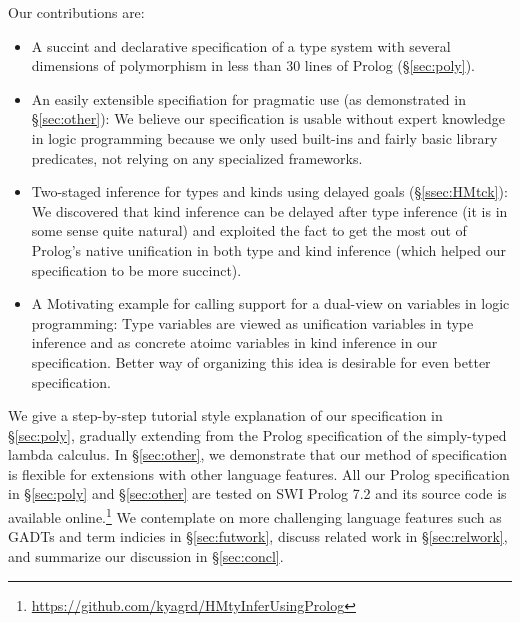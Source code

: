 Our contributions are:
\begin{itemize}\vspace*{-1ex}
\item A succint and declarative specification of
	a type system with several dimensions of polymorphism
	in less than 30 lines of Prolog (\S\ref{sec:poly}).
\item An easily extensible specifiation for pragmatic use
	(as demonstrated in \S\ref{sec:other}):
We believe our specification is usable without expert knowledge
in logic programming because we only used built-ins and fairly basic
library predicates, not relying on any specialized frameworks.
\item Two-staged inference for types and kinds using delayed goals
	(\S\ref{ssec:HMtck}):
We discovered that kind inference can be delayed after type inference
(it is in some sense quite natural) and exploited the fact to get the
most out of Prolog's native unification in both type and kind inference
(which helped our specification to be more succinct).
\item A Motivating example for calling support for a dual-view
	on variables in logic programming:
Type variables are viewed as unification variables
in type inference and as concrete atoimc variables
in kind inference in our specification.
Better way of organizing this idea is desirable
for even better specification.
\end{itemize}

We give a step-by-step tutorial style explanation of our specification in
\S\ref{sec:poly}, gradually extending from the Prolog specification of
the simply-typed lambda calculus. In \S\ref{sec:other}, we demonstrate
that our method of specification is flexible for extensions with
other language features. All our Prolog specification in \S\ref{sec:poly}
and \S\ref{sec:other} are tested on SWI Prolog 7.2 and its source code is
available online.\footnote{
	\url{https://github.com/kyagrd/HMtyInferUsingProlog} }
We contemplate on more challenging language features such as GADTs and
term indicies in \S\ref{sec:futwork}, discuss related work in
\S\ref{sec:relwork}, and summarize our discussion in \S\ref{sec:concl}.




